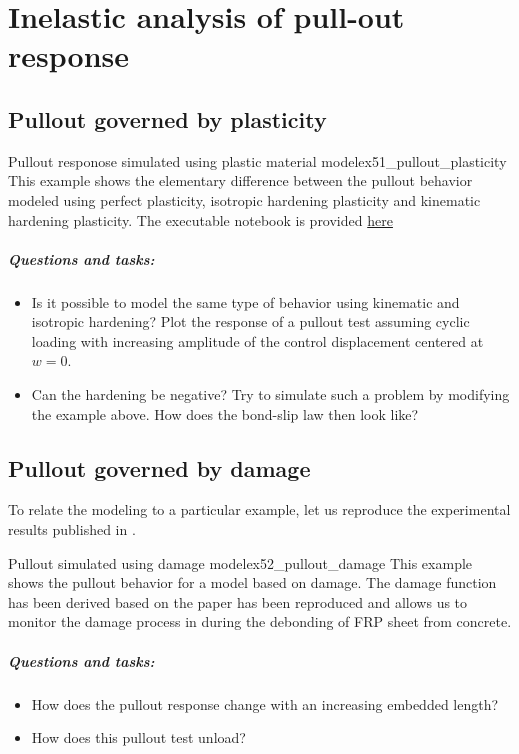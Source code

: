 \documentclass[main.tex]{subfiles}
\begin{document}
\chapter{Inelastic analysis of pull-out response}

\section{Pullout governed by plasticity}

\begin{bmcsex}{Pullout responose simulated using plastic material model}{ex51_pullout_plasticity}
This example shows the elementary difference between the pullout behavior 
modeled using perfect plasticity, isotropic hardening plasticity and kinematic hardening plasticity.
The executable notebook is provided \href{https://wiki.imb.rwth-aachen.de/do/view/IMB/Teaching/TeachExampleObj0015}{here}

\paragraph{Questions and tasks:}
\begin{itemize}
\item
Is it possible to model the same type of behavior using kinematic and isotropic hardening?
Plot the response of a pullout test assuming cyclic loading with increasing amplitude
of the control displacement centered at $w=0$. 
\item
Can the hardening be negative? Try to simulate such a problem by modifying the example above.
How does the bond-slip law then look like?
\end{itemize}

\end{bmcsex}


\section{Pullout governed by damage}

To relate the modeling to a particular example, let us reproduce the experimental results published in
\cite{dai_development_2005}. 
%

\begin{bmcsex}{Pullout simulated using damage model}{ex52_pullout_damage}
This example shows the pullout behavior for a model based on damage. 
The damage function has been derived based on the paper \cite{dai_development_2005} 
has been reproduced and allows us to monitor the damage process in during the
debonding of FRP sheet from concrete.

\paragraph{Questions and tasks:}
\begin{itemize}
\item
How does the pullout response change with an increasing embedded length?
\item
How does this pullout test unload?
\end{itemize}
\end{bmcsex}
\end{document}
